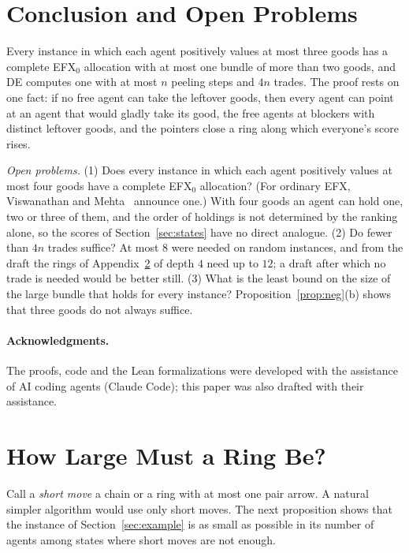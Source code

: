 \documentclass[runningheads,11pt]{llncs}
\newcommand{\efxz}{\texorpdfstring{\mbox{EFX$_0$}}{EFX0}}
\newcommand{\DE}{\textup{DE}}
\begin{document}
\section{Conclusion and Open Problems}\label{sec:concl}

Every instance in which each agent positively values at most three goods has a complete \efxz{} allocation with at most one bundle of more than two goods, and \DE{} computes one with at most $n$ peeling steps and $4n$ trades. The proof rests on one fact: if no free agent can take the leftover goods, then every agent can point at an agent that would gladly take its good, the free agents at blockers with distinct leftover goods, and the pointers close a ring along which everyone's score rises.

\emph{Open problems.} (1) Does every instance in which each agent positively values at most four goods have a complete \efxz{} allocation? (For ordinary EFX, Viswanathan and Mehta~\cite{ViswanathanM24} announce one.) With four goods an agent can hold one, two or three of them, and the order of holdings is not determined by the ranking alone, so the scores of Section~\ref{sec:states} have no direct analogue. (2) Do fewer than $4n$ trades suffice? At most $8$ were needed on random instances, and from the draft the rings of Appendix~\ref{app:size} of depth $4$ need up to $12$; a draft after which no trade is needed would be better still. (3) What is the least bound on the size of the large bundle that holds for every instance? Proposition~\ref{prop:neg}(b) shows that three goods do not always suffice.

\paragraph{Acknowledgments.} The proofs, code and the Lean formalizations were developed with the assistance of AI coding agents (Claude Code); this paper was also drafted with their assistance.




\appendix

\section{How Large Must a Ring Be?}\label{app:size}

Call a \emph{short move} a chain or a ring with at most one pair arrow. A natural simpler algorithm would use only short moves. The next proposition shows that the instance of Section~\ref{sec:example} is as small as possible in its number of agents among states where short moves are not enough.
\end{document}
